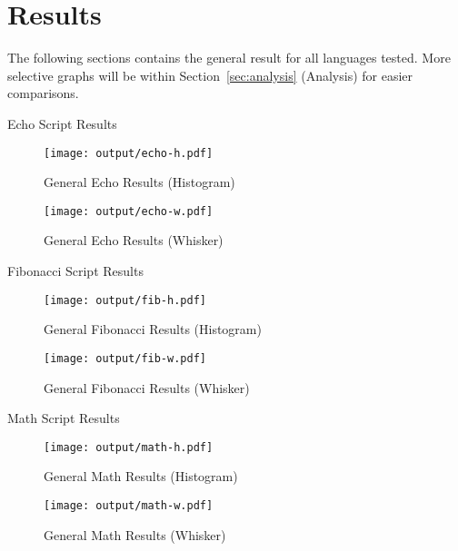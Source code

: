 \section{Results} \label{sec:results}
The following sections contains the general result for all languages tested. More selective graphs will be within Section~\ref{sec:analysis} (Analysis) for easier comparisons.

\begin{table}[H]
	\centering
	\caption{Echo Script Results}
	\label{tab:echo}
\end{table}

\begin{figure}[H]
	\centering
		\texttt{[image: output/echo-h.pdf]}
	\caption{General Echo Results (Histogram)}
	\label{fig:echo-h}
\end{figure}

\begin{figure}[H]
	\centering
		\texttt{[image: output/echo-w.pdf]}
	\caption{General Echo Results (Whisker)}
	\label{fig:echo-w}
\end{figure}

\begin{table}[H]
	\centering
	\caption{Fibonacci Script Results}
	\label{tab:fib}
\end{table}

\begin{figure}[H]
	\centering
		\texttt{[image: output/fib-h.pdf]}
	\caption{General Fibonacci Results (Histogram)}
	\label{fig:fib-h}
\end{figure}

\begin{figure}[H]
	\centering
		\texttt{[image: output/fib-w.pdf]}
	\caption{General Fibonacci Results (Whisker)}
	\label{fig:fib-w}
\end{figure}

\begin{table}[H]
	\centering
	\caption{Math Script Results}
	\label{tab:math}
\end{table}

\begin{figure}[H]
	\centering
		\texttt{[image: output/math-h.pdf]}
	\caption{General Math Results (Histogram)}
	\label{fig:math-h}
\end{figure}

\begin{figure}[H]
	\centering
		\texttt{[image: output/math-w.pdf]}
	\caption{General Math Results (Whisker)}
	\label{fig:math-w}
\end{figure}
